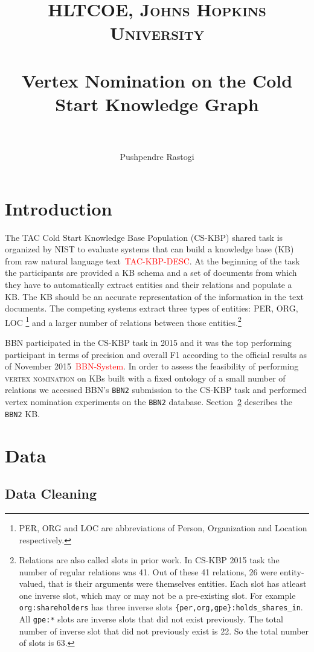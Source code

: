 \documentclass[paper=a4,fontsize=11pt]{scrartcl}
\title{
  \usefont{OT1}{bch}{b}{n}
  \normalfont\normalsize\textsc{HLTCOE, Johns Hopkins University}\\[25pt]
  \horrule{0.5pt}\\[0.4cm]
  \huge Vertex Nomination on the Cold Start Knowledge Graph\\
  \horrule{2pt}\\[0.5cm]
}
\author{
  \normalfont\normalsize
  Pushpendre Rastogi\\
}
\date{}
\newcommand{\Secref}[1]{Section~\ref{#1}}
\numberwithin{equation}{section}    %
\numberwithin{figure}{section}      %
\numberwithin{table}{section}       %
\renewcommand{\cite}[1]{\textcolor{red}{#1}}
\begin{document}
\maketitle
\section{Introduction}
\label{sec:introduction}
The TAC Cold Start Knowledge Base Population (CS-KBP) shared task is organized by
NIST to evaluate systems that can build a knowledge base (KB) from raw natural
language text~\cite{TAC-KBP-DESC}. 
At the beginning of the task the participants
are provided a KB schema and a set of documents 
from which they have to automatically extract entities and their relations and
populate a KB. The KB should be an accurate representation of the information 
in the text documents. The competing systems 
extract three types of entities: \textsc{PER, ORG, LOC}
\footnote{PER, ORG and LOC are abbreviations of Person, Organization and
  Location respectively.}
and a larger number of relations between those entities.\footnote{
Relations are also called slots in prior work. In CS-KBP 2015 task
the number of regular relations was 41. Out of these 41 relations, 
26 were entity-valued, that is their arguments were themselves entities.
Each slot has atleast one inverse slot, which may or may not be a pre-existing
slot. For example \texttt{org:shareholders} has three inverse slots
\texttt{\{per,org,gpe\}:holds_shares_in}. All \texttt{gpe:*} slots are inverse
slots that did not exist previously. The total
number of inverse slot that did not previously exist is 22. So the total
number of slots is 63.}

BBN participated in the CS-KBP task in 2015 and it was the top performing
participant in terms of precision and overall F1 according to the official 
results as of November 2015~\cite{BBN-System}. In order to assess the 
feasibility of performing \textsc{vertex nomination} on KBs built with a
fixed ontology of a small number of relations we accessed BBN's \texttt{BBN2} 
submission to the CS-KBP task and performed vertex nomination experiments on 
the \texttt{BBN2} database. \Secref{sec:data} describes the \texttt{BBN2} KB.


\section{Data}
\label{sec:data}

\subsection{Data Cleaning}
\label{sec:data-cleaning}
\end{document}
